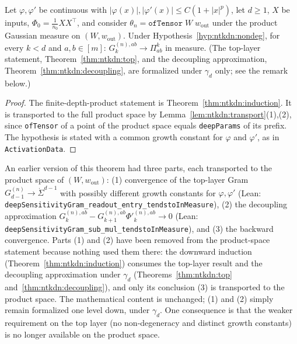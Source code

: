 \begin{theorem}\label{thm:ntkdn:backwardConvergence}
  \leanok
Let $\varphi,\varphi'$ be continuous with $|\varphi(x)|,|\varphi'(x)|\le C(1+|x|^p)$, let $d\ge1$, $X$ be inputs, $\Phi_0=\frac1{n_0}XX^\top$, and consider $\theta_n=\texttt{ofTensor}\;W\;w_{\mathrm{out}}$ under the product Gaussian measure on $(W,w_{\mathrm{out}})$.
Under Hypothesis~\ref{hyp:ntkdn:nondeg}, for every $k<d$ and $a,b\in[m]$:
$G_k^{(n),ab}\to\Pi^k_{ab}$ in measure. (The top-layer statement,
Theorem~\ref{thm:ntkdn:top}, and the decoupling approximation,
Theorem~\ref{thm:ntkdn:decoupling}, are formalized under $\gamma_d$ only; see the remark below.)
\end{theorem}

\begin{proof}
  \leanok
The finite-depth-product statement is Theorem~\ref{thm:ntkdn:induction}. It is transported to the
full product space by Lemma~\ref{lem:ntkdn:transport}(1),(2), since \texttt{ofTensor} of a point
of the product space equals \texttt{deepParams} of its prefix. The hypothesis is stated with a
common growth constant for $\varphi$ and $\varphi'$, as in \texttt{ActivationData}.
\end{proof}

\begin{remark}\label{rmk:ntkdn:backwardConvergenceChange}
An earlier version of this theorem had three parts, each transported to the product space of
$(W,w_{\mathrm{out}})$: (1) convergence of the top-layer Gram
$G_{d-1}^{(n)}\to\dot\Sigma^{d-1}$ with possibly different growth constants for
$\varphi,\varphi'$ (Lean: \texttt{deepSensitivityGram\_readout\_entry\_tendstoInMeasure}),
(2) the decoupling approximation $G_k^{(n),ab}-G_{k+1}^{(n),ab}\Phi'^{(n),ab}_k\to0$
(Lean: \texttt{deepSensitivityGram\_sub\_mul\_tendstoInMeasure}), and (3) the backward
convergence. Parts (1) and (2) have been removed from the product-space statement because
nothing used them there: the downward induction (Theorem~\ref{thm:ntkdn:induction}) consumes the
top-layer result and the decoupling approximation under $\gamma_d$
(Theorems~\ref{thm:ntkdn:top} and~\ref{thm:ntkdn:decoupling}), and only its conclusion (3) is
transported to the product space. The mathematical content is unchanged; (1) and (2) simply
remain formalized one level down, under $\gamma_d$. One consequence is that the weaker requirement
on the top layer (no non-degeneracy and distinct growth constants) is no longer available on the
product space.
\end{remark}


